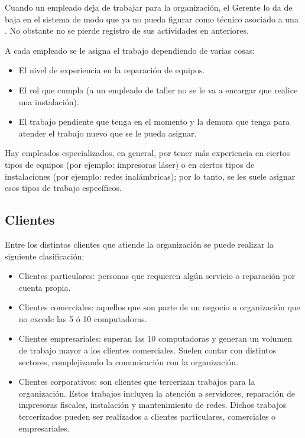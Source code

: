 \documentclass[12pt]{extarticle}
\begin{document}
\begin{spacing}{1.2}
    Cuando un empleado deja de trabajar para la organización, el Gerente lo da de baja en el sistema de modo que ya no pueda figurar como técnico asociado a una \OT{}. No obstante no se pierde registro de sus actividades en \OTs{} anteriores. 

    A cada empleado se le asigna el trabajo dependiendo de varias cosas:
    \begin{itemize}
        \item El nivel de experiencia en la reparación de equipos.
        \item El rol que cumpla (a un empleado de taller no se le va a encargar que realice una instalación).
        \item El trabajo pendiente que tenga en el momento y la demora que tenga para atender el trabajo nuevo que se le pueda asignar. 
    \end{itemize}

    Hay empleados especializados, en general, por tener más experiencia en ciertos tipos de equipos (por ejemplo: impresoras láser) o en ciertos tipos de instalaciones (por ejemplo: redes inalámbricas); por lo tanto, se les suele asignar esos tipos de trabajo específicos.

    \pagebreak
    \subsection{Clientes}

    Entre los distintos clientes que atiende la organización se puede realizar la siguiente clasificación:
    \begin{itemize}
        \item Clientes particulares: personas que requieren algún servicio o reparación por cuenta propia.
        \item Clientes comerciales: aquellos que son parte de un negocio u organización que no excede las 5 ó 10 computadoras.
        \item Clientes empresariales: superan las 10 computadoras y generan un volumen de trabajo mayor a los clientes comerciales. Suelen contar con distintos sectores, complejizando la comunicación con la organización.
        \item Clientes corporativos: son clientes que tercerizan trabajos para la organización. Estos trabajos incluyen la atención a servidores, reparación de impresoras fiscales, instalación y mantenimiento de redes. Dichos trabajos tercerizados pueden ser realizados a clientes particulares, comerciales o empresariales.
    \end{itemize}


\end{spacing}
\end{document}
